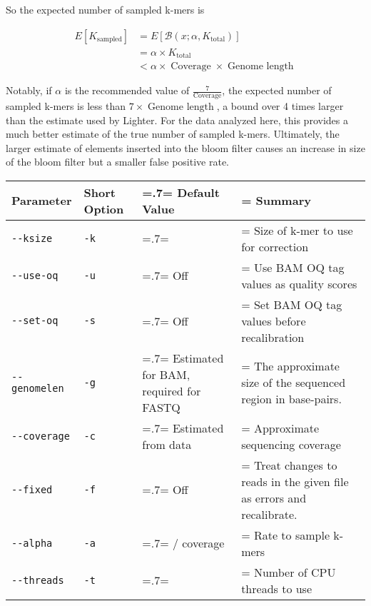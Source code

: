 So the expected number of sampled k-mers is

\begin{align}
E[K_{\operatorname{sampled}}] &= E[\mathcal{B}(x; \alpha, K_{\operatorname{total}})] \\
&= \alpha \times K_{\operatorname{total}} \\
&< \alpha \times \operatorname{Coverage} \times \operatorname{Genome\:length}
\end{align}

Notably, if $\alpha$ is the recommended value of $\frac{7}{\operatorname{Coverage}}$, the expected number of sampled k-mers is less than $7 \times \operatorname{Genome\:length}$, a bound over 4 times larger than the estimate used by Lighter. For the data analyzed here, this provides a much better estimate of the true number of sampled k-mers. Ultimately, the larger estimate of elements inserted into the bloom filter causes an increase in size of the bloom filter but a smaller false positive rate.

\begin{table}
\centering
\begin{tabularx}{\textwidth}{ l  l >{\hsize=.7\hsize\linewidth=\hsize}X >{\hsize=1.3\hsize\linewidth=\hsize}X }
\toprule
\textbf{Parameter} & \textbf{Short Option} & \textbf{Default Value} & \textbf{Summary} \\
\midrule
\texttt{-\phantom{}-ksize} & \texttt{-k} & 32 & Size of k-mer to use for correction\\
\texttt{-\phantom{}-use-oq} & \texttt{-u} & Off & Use BAM OQ tag values as quality scores\\
\texttt{-\phantom{}-set-oq} & \texttt{-s} & Off & Set BAM OQ tag values before recalibration\\
\texttt{-\phantom{}-genomelen} & \texttt{-g} & Estimated for BAM, \newline required for FASTQ & The approximate size of the sequenced region in base-pairs.\\
\texttt{-\phantom{}-coverage} & \texttt{-c} & Estimated from data & Approximate sequencing coverage\\
\texttt{-\phantom{}-fixed} & \texttt{-f} & Off & Treat changes to reads in the given file as errors and recalibrate. \\
\texttt{-\phantom{}-alpha} & \texttt{-a} & 7 / coverage & Rate to sample k-mers\\
\texttt{-\phantom{}-threads} & \texttt{-t} & 1 & Number of CPU threads to use\\
\bottomrule
\end{tabularx}
\label{table:params}
\end{table}

